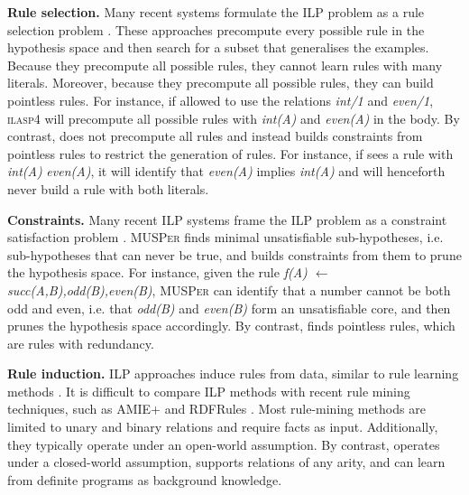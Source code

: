 \textbf{Rule selection.}
Many recent systems formulate the ILP problem as a rule selection problem \cite{aspal,hexmil,prosynth,aspsynth,ilasp4}.
These approaches precompute every possible rule in the hypothesis space and then search for a subset that generalises the examples.
Because they precompute all possible rules, they cannot learn rules with many literals.
Moreover, because they precompute all possible rules, they can build pointless rules. 
For instance, if allowed to use the relations \emph{int/1} and \emph{even/1}, \textsc{ilasp4} \cite{ilasp4} will precompute all possible rules with \emph{int(A)} and \emph{even(A)} in the body.
By contrast, \name{} does not precompute all rules and instead builds constraints from pointless rules to restrict the generation of rules. 
For instance, if \name{} sees a rule with \emph{int(A)} \emph{even(A)}, it will identify that \emph{even(A)} implies \emph{int(A)} and will henceforth never build a rule with both literals. 





\textbf{Constraints.}
Many recent ILP systems frame the ILP problem as a constraint satisfaction problem \cite{aspal,atom,inspire,hexmil,aspsynth}.
\textsc{MUSPer} \cite{musper} finds minimal unsatisfiable sub-hypotheses, i.e. sub-hypotheses that can never be true, and builds constraints from them to prune the hypothesis space.
For instance, given the rule 
\emph{f(A) $\leftarrow$ succ(A,B),odd(B),even(B)},
\textsc{MUSPer} can identify that a number cannot be both odd and even, i.e. that \emph{odd(B)} and \emph{even(B)} form an unsatisfiable core, and then prunes the hypothesis space accordingly.
By contrast, \name{} finds pointless rules, which are rules with redundancy.

\textbf{Rule induction.}
ILP approaches induce rules from data, similar to rule learning methods \cite{DBLP:conf/ruleml/FurnkranzK15}.
It is difficult to compare ILP methods with recent rule mining techniques, such as AMIE+ \cite{DBLP:journals/vldb/GalarragaTHS15} and RDFRules \cite{rdfrules}.
Most rule-mining methods are limited to unary and binary relations and require facts as input. Additionally, they typically operate under an open-world assumption. 
By contrast, \name{} operates under a closed-world assumption, supports relations of any arity, and can learn from definite programs as background knowledge.

